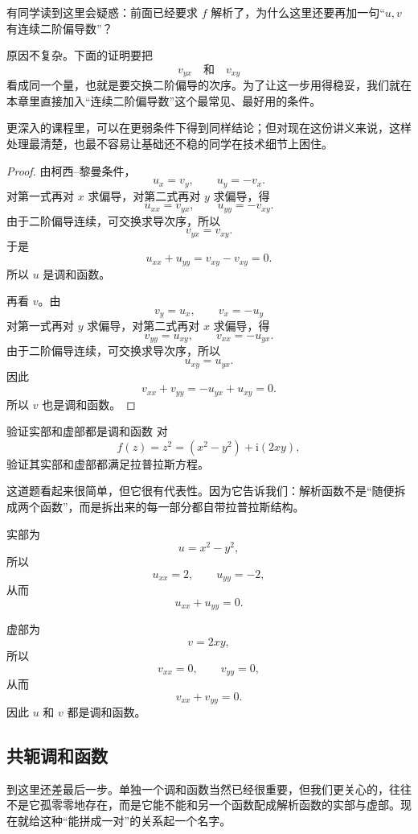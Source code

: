 \begin{tishi}[为什么这里要额外要求连续二阶偏导数]
有同学读到这里会疑惑：前面已经要求 $f$ 解析了，为什么这里还要再加一句``$u,v$ 有连续二阶偏导数''？

原因不复杂。下面的证明要把
\[
    v_{yx}\quad \text{和}\quad v_{xy}
\]
看成同一个量，也就是要交换二阶偏导的次序。为了让这一步用得稳妥，我们就在本章里直接加入``连续二阶偏导数''这个最常见、最好用的条件。

更深入的课程里，可以在更弱条件下得到同样结论；但对现在这份讲义来说，这样处理最清楚，也最不容易让基础还不稳的同学在技术细节上困住。
\end{tishi}

\begin{proof}
由柯西--黎曼条件，
\[
    u_x=v_y,\qquad u_y=-v_x.
\]
对第一式再对 $x$ 求偏导，对第二式再对 $y$ 求偏导，得
\[
    u_{xx}=v_{yx},\qquad u_{yy}=-v_{xy}.
\]
由于二阶偏导连续，可交换求导次序，所以
\[
    v_{yx}=v_{xy}.
\]
于是
\[
    u_{xx}+u_{yy}=v_{xy}-v_{xy}=0.
\]
所以 $u$ 是调和函数。

再看 $v$。由
\[
    v_y=u_x,\qquad v_x=-u_y
\]
对第一式再对 $y$ 求偏导，对第二式再对 $x$ 求偏导，得
\[
    v_{yy}=u_{xy},\qquad v_{xx}=-u_{yx}.
\]
由于二阶偏导连续，可交换求导次序，所以
\[
    u_{xy}=u_{yx}.
\]
因此
\[
    v_{xx}+v_{yy}=-u_{yx}+u_{xy}=0.
\]
所以 $v$ 也是调和函数。
\end{proof}

\begin{lizi}{验证实部和虚部都是调和函数}{}
对
\[
    f(z)=z^2=(x^2-y^2)+\mathrm{i}(2xy),
\]
验证其实部和虚部都满足拉普拉斯方程。

\begin{jie}
这道题看起来很简单，但它很有代表性。因为它告诉我们：解析函数不是``随便拆成两个函数''，而是拆出来的每一部分都自带拉普拉斯结构。

实部为
\[
    u=x^2-y^2,
\]
所以
\[
    u_{xx}=2,\qquad u_{yy}=-2,
\]
从而
\[
    u_{xx}+u_{yy}=0.
\]

虚部为
\[
    v=2xy,
\]
所以
\[
    v_{xx}=0,\qquad v_{yy}=0,
\]
从而
\[
    v_{xx}+v_{yy}=0.
\]
因此 $u$ 和 $v$ 都是调和函数。
\end{jie}
\end{lizi}

\subsection{共轭调和函数}

\noindent 到这里还差最后一步。单独一个调和函数当然已经很重要，但我们更关心的，往往不是它孤零零地存在，而是它能不能和另一个函数配成解析函数的实部与虚部。现在就给这种``能拼成一对''的关系起一个名字。

